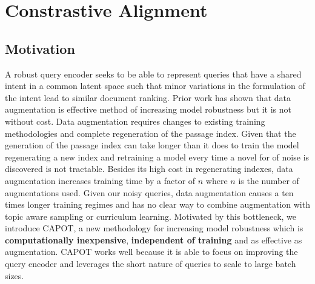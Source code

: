 \section{Constrastive Alignment}
\subsection{Motivation}
A robust query encoder seeks to be able to represent queries that have a shared intent in a common latent space such that minor variations in the formulation of the intent lead to similar document ranking. Prior work has shown that data augmentation is effective method of increasing model robustness but it is not without cost. Data augmentation requires changes to existing training methodologies and complete regeneration of the passage index. Given that the generation of the passage index can take longer than it does to train the model \cite{Karpukhin2020DensePR} regenerating a new index and retraining a model every time a novel for of noise is discovered is not tractable. Besides its high cost in regenerating indexes, data augmentation increases training time by a factor of $n$ where $n$ is the number of augmentations used. Given our noisy queries, data augmentation causes a ten times longer training regimes and has no clear way to combine augmentation with topic aware sampling or curriculum learning. Motivated by this bottleneck, we introduce CAPOT, a new methodology for increasing model robustness which is \textbf{computationally inexpensive}, \textbf{independent of training} and as effective as augmentation. CAPOT works well because it is able to focus on improving the query encoder and leverages the short nature of queries to scale to large batch sizes.  \\
